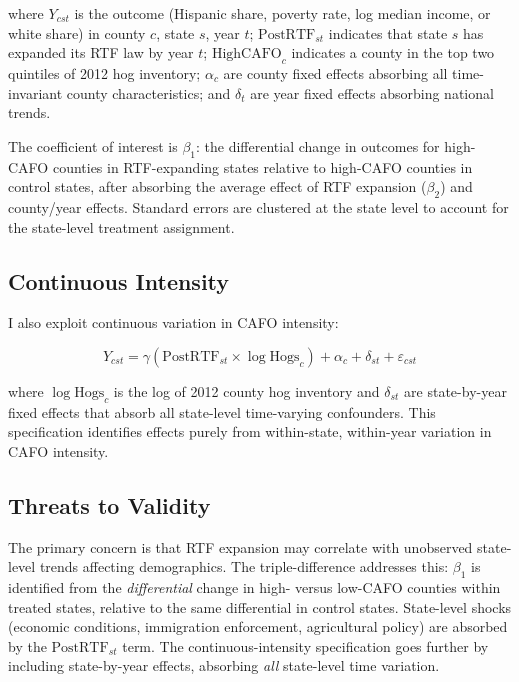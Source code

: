 \documentclass[12pt]{article}
\begin{document}
\noindent where $Y_{cst}$ is the outcome (Hispanic share, poverty rate, log median income, or white share) in county $c$, state $s$, year $t$; $\text{PostRTF}_{st}$ indicates that state $s$ has expanded its RTF law by year $t$; $\text{HighCAFO}_c$ indicates a county in the top two quintiles of 2012 hog inventory; $\alpha_c$ are county fixed effects absorbing all time-invariant county characteristics; and $\delta_t$ are year fixed effects absorbing national trends.

The coefficient of interest is $\beta_1$: the differential change in outcomes for high-CAFO counties in RTF-expanding states relative to high-CAFO counties in control states, after absorbing the average effect of RTF expansion ($\beta_2$) and county/year effects. Standard errors are clustered at the state level to account for the state-level treatment assignment.

\subsection{Continuous Intensity}

I also exploit continuous variation in CAFO intensity:

\begin{equation}
Y_{cst} = \gamma (\text{PostRTF}_{st} \times \log \text{Hogs}_c) + \alpha_c + \delta_{st} + \varepsilon_{cst}
\label{eq:continuous}
\end{equation}

\noindent where $\log \text{Hogs}_c$ is the log of 2012 county hog inventory and $\delta_{st}$ are state-by-year fixed effects that absorb all state-level time-varying confounders. This specification identifies effects purely from within-state, within-year variation in CAFO intensity.

\subsection{Threats to Validity}

The primary concern is that RTF expansion may correlate with unobserved state-level trends affecting demographics. The triple-difference addresses this: $\beta_1$ is identified from the \textit{differential} change in high- versus low-CAFO counties within treated states, relative to the same differential in control states. State-level shocks (economic conditions, immigration enforcement, agricultural policy) are absorbed by the $\text{PostRTF}_{st}$ term. The continuous-intensity specification goes further by including state-by-year effects, absorbing \textit{all} state-level time variation.
\end{document}
